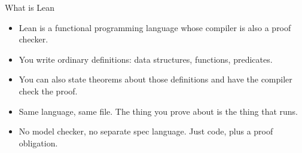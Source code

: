 \documentclass[10pt,aspectratio=169]{beamer}
\begin{document}
\begin{frame}{What is Lean}
\begin{itemize}\itemsep0.5em
  \item Lean is a functional programming language whose compiler is also a proof checker.
  \item You write ordinary definitions: data structures, functions, predicates.
  \item You can also state theorems about those definitions and have the compiler check the proof.
  \item Same language, same file. The thing you prove about is the thing that runs.
  \item No model checker, no separate spec language. Just code, plus a proof obligation.
\end{itemize}
\end{frame}
\end{document}
